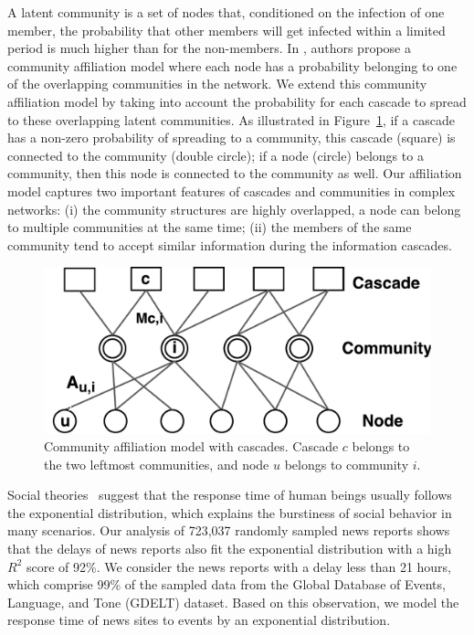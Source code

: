 A latent community is a set of nodes that, conditioned on the infection of one member, the probability that other members will get infected within a limited period is much higher than for the non-members. In \cite{yang2013overlapping}, authors propose a community affiliation model where each node has a probability belonging to one of the overlapping communities in the network. We extend this community affiliation model by taking into account the probability for each cascade to spread to these overlapping latent communities. As illustrated in Figure~\ref{fig:affiliation_model1}, if a cascade has a non-zero probability of spreading to a community, this cascade (square) is connected to the community (double circle); if a node (circle) belongs to a community, then this node is connected to the community as well. Our affiliation model captures two important features of cascades and communities in complex networks: (i) the community structures are highly overlapped, a node can belong to multiple communities at the same time; (ii) the members of the same community tend to accept similar information during the information cascades. 

\begin{figure}
\includegraphics[width=.6\textwidth]{img/chap3/affiliation_model_V2.pdf}
\centering
\caption{Community affiliation model with cascades. Cascade $c$ belongs to the two leftmost communities, and node $u$ belongs to community $i$.}\label{fig:affiliation_model1}
\end{figure}

Social theories~\cite{barabasi2005origin} suggest that the response time of human beings usually follows the exponential distribution, which explains the burstiness of social behavior in many scenarios. Our analysis of 723,037 randomly sampled news reports shows that the delays of news reports also fit the exponential distribution with a high $R^2$ score of 92\%. We consider the news reports with a delay less than 21 hours, which comprise 99\% of the sampled data from the Global Database of Events, Language, and Tone (GDELT) dataset. Based on this observation, we model the response time of news sites to events by an exponential distribution.

